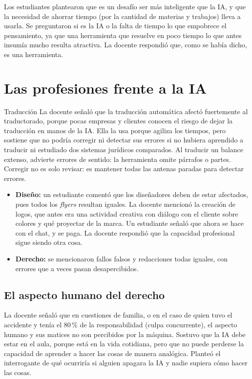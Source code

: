 \documentclass[12pt,oneside]{book}
\begin{document}
Los estudiantes plantearon que es un desafío ser más inteligente que la IA, y que la necesidad de ahorrar tiempo (por la cantidad de materias y trabajos) lleva a usarla. Se preguntaron si es la IA o la falta de tiempo lo que empobrece el pensamiento, ya que una herramienta que resuelve en poco tiempo lo que antes insumía mucho resulta atractiva. La docente respondió que, como se había dicho, es una herramienta.

\section{Las profesiones frente a la IA}

\begin{example}{Traducción}
La docente señaló que la traducción automática afectó fuertemente al traductorado, porque pocas empresas y clientes conocen el riesgo de dejar la traducción en manos de la IA. Ella la usa porque agiliza los tiempos, pero sostiene que no podría corregir ni detectar sus errores si no hubiera aprendido a traducir ni estudiado dos sistemas jurídicos comparados. Al traducir un balance extenso, advierte errores de sentido: la herramienta omite párrafos o partes. Corregir no es solo revisar: es mantener todas las antenas paradas para detectar errores.
\end{example}

\begin{itemize}
    \item \textbf{Diseño:} un estudiante comentó que los diseñadores deben de estar afectados, pues todos los \textit{flyers} resultan iguales. La docente mencionó la creación de logos, que antes era una actividad creativa con diálogo con el cliente sobre colores y qué proyectar de la marca. Un estudiante señaló que ahora se hace con el chat, y se paga. La docente respondió que la capacidad profesional sigue siendo otra cosa.
    \item \textbf{Derecho:} se mencionaron fallos falsos y redacciones todas iguales, con errores que a veces pasan desapercibidos.
\end{itemize}

\subsection{El aspecto humano del derecho}

La docente señaló que en cuestiones de familia, o en el caso de quien tuvo el accidente y tenía el 80\,\% de la responsabilidad (culpa concurrente), el aspecto humano y sus matices no son percibidos por la máquina. Sostuvo que la IA debe estar en el aula, porque está en la vida cotidiana, pero que no puede perderse la capacidad de aprender a hacer las cosas de manera analógica. Planteó el interrogante de qué ocurriría si alguien apagara la IA y nadie supiera cómo hacer las cosas.
\end{document}
